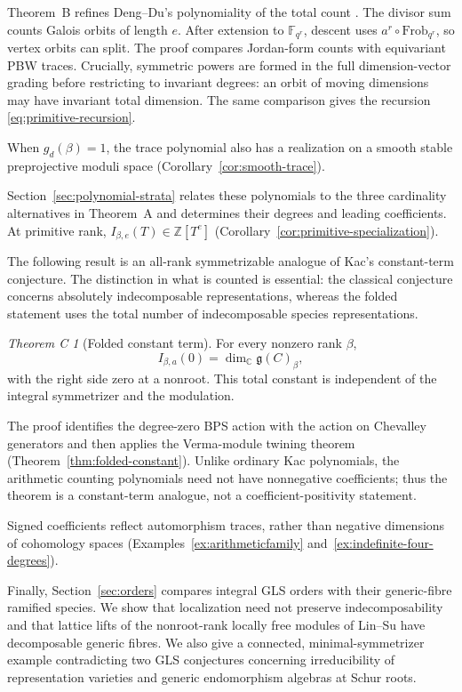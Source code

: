 \documentclass[11pt, reqno]{amsart}
\numberwithin{equation}{section}
\theoremstyle{definition}
\theoremstyle{remark}
\newtheorem*{theoremC}{Theorem C}
\newcommand{\mr}[1]{\mathrm{#1}}
\newcommand{\mb}[1]{\mathbb{#1}}
\begin{document}
Theorem~B refines Deng--Du's polynomiality of the total count
\cite[Corollary~9.2]{DengDu}. The divisor sum counts Galois
orbits of length $e$. After extension to $\mb F_{q^r}$, descent uses
$a^r\circ\mr{Frob}_{q^r}$, so vertex orbits can split.
The proof compares Jordan-form counts with equivariant PBW traces.
Crucially, symmetric powers are formed in the full dimension-vector
grading before restricting to invariant degrees: an orbit of moving
dimensions may have invariant total dimension. The same comparison
gives the recursion \eqref{eq:primitive-recursion}.

When $g_d(\beta)=1$, the trace polynomial also has a realization on a
smooth stable preprojective moduli space
(Corollary~\ref{cor:smooth-trace}).

Section~\ref{sec:polynomial-strata} relates these polynomials to
the three cardinality alternatives in Theorem~A and determines
their degrees and leading coefficients. At primitive rank,
$I_{\beta,e}(T)\in\mb Z[T^e]$ (Corollary~\ref{cor:primitive-specialization}).

The following result is an all-rank symmetrizable analogue of
Kac's constant-term conjecture. The distinction in what is counted
is essential: the classical conjecture concerns absolutely indecomposable
representations, whereas the folded statement uses the total number of
indecomposable species representations.

\begin{theoremC}[Folded constant term]
For every nonzero rank $\beta$,
\[ I_{\beta,a}(0)=\dim_{\mb C}\mathfrak g(C)_\beta, \]
with the right side zero at a nonroot. This total constant is
independent of the integral symmetrizer and the modulation.
\end{theoremC}

The proof identifies the degree-zero BPS action with the action on
Chevalley generators and then applies the Verma-module twining theorem
(Theorem~\ref{thm:folded-constant}). Unlike ordinary Kac polynomials,
the arithmetic counting polynomials need not have nonnegative
coefficients; thus the theorem is a constant-term analogue, not
a coefficient-positivity statement.

Signed coefficients reflect automorphism traces, rather than
negative dimensions of cohomology spaces
(Examples~\ref{ex:arithmeticfamily} and~\ref{ex:indefinite-four-degrees}).

Finally, Section~\ref{sec:orders} compares integral GLS orders with
their generic-fibre ramified species. We show that localization
need not preserve indecomposability and that lattice lifts of the
nonroot-rank locally free modules of Lin--Su \cite{LinSu} have decomposable
generic fibres. We also give a connected, minimal-symmetrizer example
contradicting two GLS conjectures concerning irreducibility of
representation varieties and generic endomorphism algebras at Schur roots.
\end{document}
